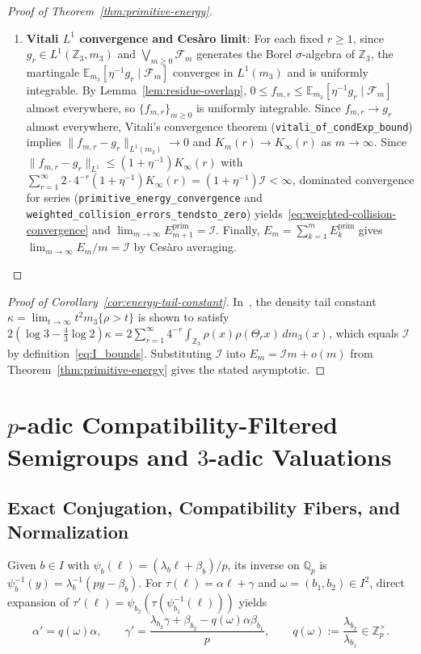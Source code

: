 \documentclass[11pt,a4paper]{article}
\numberwithin{equation}{section}
\theoremstyle{definition}
\theoremstyle{remark}
\newcommand{\Z}{\mathbb{Z}}
\newcommand{\Q}{\mathbb{Q}}
\newcommand{\E}{\mathbb{E}}
\newcommand{\cF}{\mathcal{F}}
\newcommand{\cI}{\mathcal{I}}
\newcommand{\prim}{\mathrm{prim}}
\begin{document}
\begin{proof}[Proof of Theorem~\ref{thm:primitive-energy}]
\begin{enumerate}[label=(\arabic*),topsep=2pt,itemsep=2pt]
\item \textbf{Vitali $L^1$ convergence and Ces\`aro limit}: For each fixed $r \ge 1$, since $g_r \in L^1(\Z_3, m_3)$ and $\bigvee_{m \ge 0} \cF_m$ generates the Borel $\sigma$-algebra of $\Z_3$, the martingale $\E_{m_3}[\eta^{-1} g_r \mid \cF_m]$ converges in $L^1(m_3)$ and is uniformly integrable. By Lemma~\ref{lem:residue-overlap}, $0 \le f_{m, r} \le \E_{m_3}[\eta^{-1} g_r \mid \cF_m]$ almost everywhere, so $\{f_{m, r}\}_{m \ge 0}$ is uniformly integrable. Since $f_{m, r} \to g_r$ almost everywhere, Vitali's convergence theorem (\texttt{vitali\_of\_condExp\_bound}) implies $\|f_{m, r} - g_r\|_{L^1(m_3)} \to 0$ and $K_m(r) \to K_\infty(r)$ as $m \to \infty$. Since $\|f_{m, r} - g_r\|_{L^1} \le (1 + \eta^{-1})K_\infty(r)$ with $\sum_{r=1}^\infty 2\cdot 4^{-r}(1 + \eta^{-1})K_\infty(r) = (1 + \eta^{-1})\cI < \infty$, dominated convergence for series (\texttt{primitive\_energy\_convergence} and \texttt{weighted\_collision\_errors\_tendsto\_zero}) yields~\eqref{eq:weighted-collision-convergence} and $\lim_{m \to \infty} E_{m+1}^{\prim} = \cI$. Finally, $E_m = \sum_{k=1}^m E_k^{\prim}$ gives $\lim_{m \to \infty} E_m / m = \cI$ by Ces\`aro averaging.
\end{enumerate}
\end{proof}

\begin{proof}[Proof of Corollary~\ref{cor:energy-tail-constant}]
In~\cite[\S 8, (25)]{Weaver2026}, the density tail constant $\kappa = \lim_{t \to \infty} t^2 m_3\{\rho > t\}$ is shown to satisfy $2(\log 3 - \frac{4}{3}\log 2)\kappa = 2\sum_{r=1}^\infty 4^{-r} \int_{\Z_3} \rho(x)\rho(\Theta_r x)\,dm_3(x)$, which equals $\cI$ by definition~\eqref{eq:I_bounds}. Substituting $\cI$ into $E_m = \cI m + o(m)$ from Theorem~\ref{thm:primitive-energy} gives the stated asymptotic.
\end{proof}

\section{$p$-adic Compatibility-Filtered Semigroups and $3$-adic Valuations}\label{sec:semigroup}

\subsection{Exact Conjugation, Compatibility Fibers, and Normalization}\label{subsec:conjugation}

Given $b \in I$ with $\psi_b(\ell) = (\lambda_b \ell + \beta_b)/p$, its inverse on $\Q_p$ is $\psi_b^{-1}(y) = \lambda_b^{-1}(p y - \beta_b)$. For $\tau(\ell) = \alpha \ell + \gamma$ and $\omega = (b_1, b_2) \in I^2$, direct expansion of $\tau'(\ell) = \psi_{b_2}(\tau(\psi_{b_1}^{-1}(\ell)))$ yields
\begin{equation}\label{eq:conj}
\alpha' = q(\omega)\alpha, \qquad \gamma' = \frac{\lambda_{b_2}\gamma + \beta_{b_2} - q(\omega)\alpha \beta_{b_1}}{p}, \qquad q(\omega) := \frac{\lambda_{b_2}}{\lambda_{b_1}} \in \Z_p^\times.
\end{equation}
\end{document}
